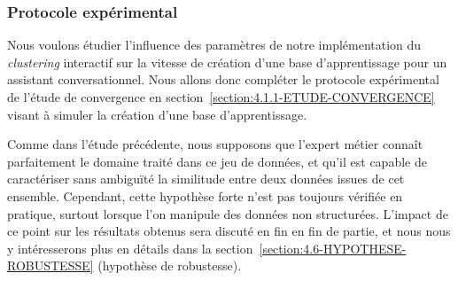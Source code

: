 		\subsubsection{Protocole expérimental}

			Nous voulons étudier l'influence des paramètres de notre implémentation du \textit{clustering} interactif sur la vitesse de création d'une base d'apprentissage pour un assistant conversationnel.
			Nous allons donc compléter le protocole expérimental de l'étude de convergence en section~\ref{section:4.1.1-ETUDE-CONVERGENCE} visant à simuler la création d'une base d'apprentissage.
			
			\begin{leftBarWarning}
				Comme dans l'étude précédente, nous supposons que l'expert métier connaît parfaitement le domaine traité dans ce jeu de données, et qu'il est capable de caractériser sans ambiguïté la similitude entre deux données issues de cet ensemble.
				Cependant, cette hypothèse forte n'est pas toujours vérifiée en pratique, surtout lorsque l'on manipule des données non structurées.
				L'impact de ce point sur les résultats obtenus sera discuté en fin en fin de partie, et nous nous y intéresserons plus en détails dans la section~\ref{section:4.6-HYPOTHESE-ROBUSTESSE} (hypothèse de robustesse).
			\end{leftBarWarning}
			

